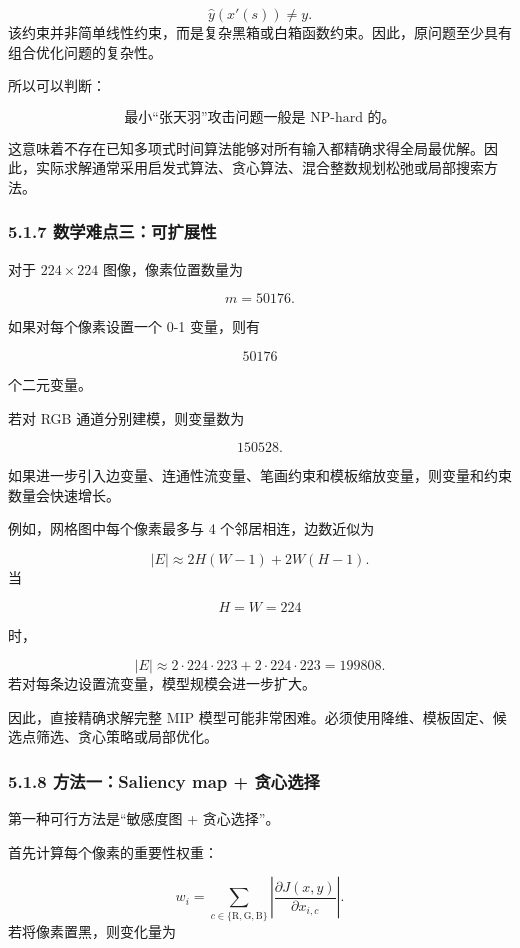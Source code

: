 ﻿\documentclass[UTF8,zihao=-4,fontset=none]{ctexart}
\begin{document}
\[
\hat y(x'(s))\ne y.
\]
\noindent 该约束并非简单线性约束，而是复杂黑箱或白箱函数约束。因此，原问题至少具有组合优化问题的复杂性。

所以可以判断：

\[
\text{最小“张天羽”攻击问题一般是 NP-hard 的。}
\]

这意味着不存在已知多项式时间算法能够对所有输入都精确求得全局最优解。因此，实际求解通常采用启发式算法、贪心算法、混合整数规划松弛或局部搜索方法。

\subsubsection*{5.1.7 数学难点三：可扩展性}
{}

对于 \(224\times224\) 图像，像素位置数量为

\[
m=50176.
\]

如果对每个像素设置一个 0-1 变量，则有

\[
50176
\]

个二元变量。

若对 RGB 通道分别建模，则变量数为

\[
150528.
\]

如果进一步引入边变量、连通性流变量、笔画约束和模板缩放变量，则变量和约束数量会快速增长。

例如，网格图中每个像素最多与 4 个邻居相连，边数近似为

\[
|E|\approx 2H(W-1)+2W(H-1).
\]
\noindent 当

\[
H=W=224
\]

时，

\[
|E|\approx 2\cdot224\cdot223+2\cdot224\cdot223
=
199808.
\]
\noindent 若对每条边设置流变量，模型规模会进一步扩大。

因此，直接精确求解完整 MIP 模型可能非常困难。必须使用降维、模板固定、候选点筛选、贪心策略或局部优化。

\subsubsection*{5.1.8 方法一：Saliency map + 贪心选择}
{}

第一种可行方法是“敏感度图 + 贪心选择”。

首先计算每个像素的重要性权重：

\[
w_i
=
\sum_{c\in\{\mathrm{R},\mathrm{G},\mathrm{B}\}}
\left|
\frac{\partial J(x,y)}{\partial x_{i,c}}
\right|.
\]
\noindent 若将像素置黑，则变化量为
\end{document}
